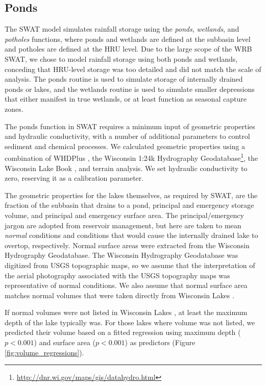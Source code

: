 \subsection{Ponds}\label{sec:ponds}
The SWAT model simulates rainfall storage using the \textit{ponds}, \textit{wetlands}, and \textit{potholes} functions, where ponds and wetlands are defined at the subbasin level and potholes are defined at the HRU level. Due to the large scope of the WRB SWAT, we chose to model rainfall storage using both ponds and wetlands, conceding that HRU-level storage was too detailed and did not match the scale of analysis. The ponds routine is used to simulate storage of internally drained ponds or lakes, and the wetlands routine is used to simulate smaller depressions that either manifest in true wetlands, or at least function as seasonal capture zones.

The ponds function in SWAT requires a minimum input of geometric properties and hydraulic conductivity, with a number of additional parameters to control sediment and chemical processes. We calculated geometric properties using a combination of WHDPlus \citep{wdnr_whdplus_2013}, the Wisconsin 1:24k Hydrography Geodatabase\footnote{\url{http://dnr.wi.gov/maps/gis/datahydro.html}}, the Wisconsin Lake Book , and terrain analysis. We set hydraulic conductivity to zero, reserving it as a calibration parameter.

The geometric properties for the lakes themselves, as required by SWAT, are the fraction of the subbasin that drains to a pond, principal and emergency storage volume, and principal and emergency surface area. The principal/emergency jargon are adopted from reservoir management, but here are taken to mean \textit{normal} conditions and conditions that would cause the internally drained lake to overtop, respectively. Normal surface areas were extracted from the Wisconsin Hydrography Geodatabase. The Wisconsin Hydrography Geodatabase was digitized from USGS topographic maps, so we assume that the interpretation of the aerial photography associated with the USGS topography maps was representative of normal conditions.  We also assume that normal surface area matches normal volumes that were taken directly from Wisconsin Lakes .

If normal volumes were not listed in Wisconsin Lakes , at least the maximum depth of the lake typically was. For those lakes where volume was not listed, we predicted their volume based on a fitted regression using maximum depth ($p < 0.001$) and surface area ($p < 0.001$) as predictors (Figure \ref{fig:volume_regressions}).

